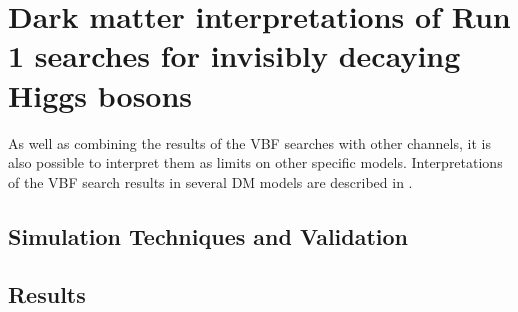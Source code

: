 \chapter{Dark matter interpretations of Run 1 searches for invisibly decaying Higgs bosons}
\label{chap:interp}
As well as combining the results of the \ac{VBF} searches with other channels, it is also possible to interpret them as limits on other specific models. Interpretations of the \ac{VBF} search results in several \ac{DM} models are described in .


\section{Simulation Techniques and Validation}
\label{sec:dmval}

\section{Results}
\label{sec:dmresults}
